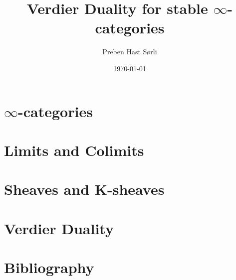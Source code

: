 \documentclass[british,titlepage]{ntnuthesis}
\title{Verdier Duality for stable $\infty$-categories}
\author{Preben Hast Sørli}
\date{\today}
\begin{document}
\tableofcontents
\listoftodos

\chapter{$\infty$-categories}

\chapter{Limits and Colimits}




\chapter{Sheaves and K-sheaves}


\chapter{Verdier Duality}

\chapter*{Bibliography}
\printbibliography[heading=none]
\end{document}
